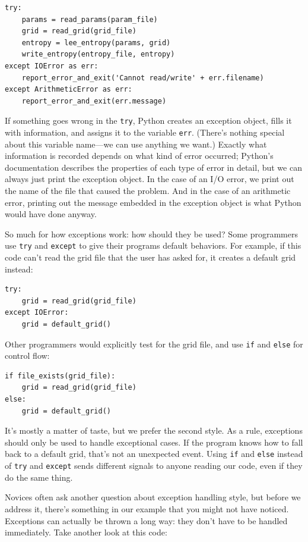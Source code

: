 \documentclass[]{book}
\begin{document}
\begin{verbatim}
try:
    params = read_params(param_file)
    grid = read_grid(grid_file)
    entropy = lee_entropy(params, grid)
    write_entropy(entropy_file, entropy)
except IOError as err:
    report_error_and_exit('Cannot read/write' + err.filename)
except ArithmeticError as err:
    report_error_and_exit(err.message)
\end{verbatim}

If something goes wrong in the \texttt{try}, Python creates an exception
object, fills it with information, and assigns it to the variable
\texttt{err}. (There's nothing special about this variable name---we can
use anything we want.) Exactly what information is recorded depends on
what kind of error occurred; Python's documentation describes the
properties of each type of error in detail, but we can always just print
the exception object. In the case of an I/O error, we print out the name
of the file that caused the problem. And in the case of an arithmetic
error, printing out the message embedded in the exception object is what
Python would have done anyway.

So much for how exceptions work: how should they be used? Some
programmers use \texttt{try} and \texttt{except} to give their programs
default behaviors. For example, if this code can't read the grid file
that the user has asked for, it creates a default grid instead:

\begin{verbatim}
try:
    grid = read_grid(grid_file)
except IOError:
    grid = default_grid()
\end{verbatim}

Other programmers would explicitly test for the grid file, and use
\texttt{if} and \texttt{else} for control flow:

\begin{verbatim}
if file_exists(grid_file):
    grid = read_grid(grid_file)
else:
    grid = default_grid()
\end{verbatim}

It's mostly a matter of taste, but we prefer the second style. As a
rule, exceptions should only be used to handle exceptional cases. If the
program knows how to fall back to a default grid, that's not an
unexpected event. Using \texttt{if} and \texttt{else} instead of
\texttt{try} and \texttt{except} sends different signals to anyone
reading our code, even if they do the same thing.

Novices often ask another question about exception handling style, but
before we address it, there's something in our example that you might
not have noticed. Exceptions can actually be thrown a long way: they
don't have to be handled immediately. Take another look at this code:
\end{document}
